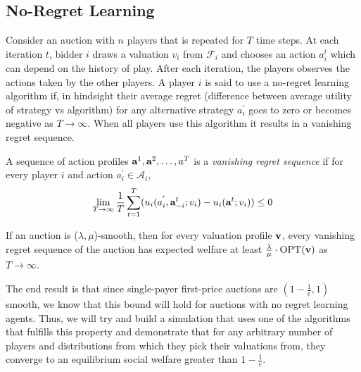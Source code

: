 \documentclass[12pt,twoside]{reedthesis}
\begin{document}
\subsection{No-Regret Learning}
Consider an auction with $n$ players that is repeated for $T$ time steps. At each iteration $t$, bidder $i$ draws a valuation $v_i$ from $\mathcal{F}_i$ and chooses an action $a_i^t$ which can depend on the history of play. After each iteration, the players observes the actions taken by the other players. 
A player $i$ is said to use a no-regret learning algorithm if, in hindsight their average regret (difference between average utility of strategy vs algorithm) for any alternative strategy $a_i^{'}$ goes to zero or becomes negative as $T \rightarrow \infty$. When all players use this algorithm it results in a vanishing regret sequence.

\begin{dfn}
	A sequence of action profiles $\textbf{a}^1 , \textbf{a}^2, \ldots, a^T$ is a \textit{vanishing regret sequence} if for every player $i$ and action $a_i^{'} \in \mathcal{A}_i$,
	$$ \lim\limits_{T \rightarrow \infty} \frac{1}{T} \sum_{t=1}^{T}(u_i(a_i^{'}, \textbf{a}_{-i}^{t};v_i) - u_i(\textbf{a}^t; v_i)) \leq 0$$
	\label{dfn:noregret} 
\end{dfn}

\begin{theorem}
	If an auction is ($\lambda, \mu$)-smooth, then for every valuation profile $\textbf{v}$, every vanishing regret sequence of the auction has expected welfare at least $\frac{\lambda}{\mu} \cdot \text{OPT}(\textbf{v})$ as $T \rightarrow \infty$.  
\end{theorem}

The end result is that since single-payer first-price auctions are $(1-\frac{1}{e}, 1)$ smooth, we know that this bound will hold for auctions with no regret learning agents. Thus, we will try and build a simulation that uses one of the algorithms that fulfills this property and demonstrate that for any arbitrary number of players and distributions from which they pick their valuations from, they converge to an equilibrium social welfare greater than $1-\frac{1}{e}$.
\end{document}
